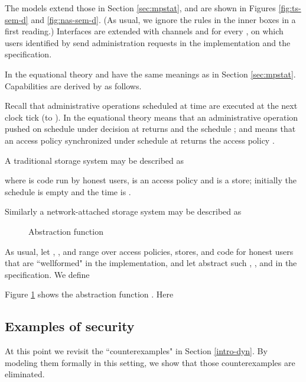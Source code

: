 \documentclass[10pt]{article}
\begin{document}
The models extend those in Section \ref{sec:mpstat}, and are shown in Figures \ref{fig:ts-sem-d} and \ref{fig:nas-sem-d}. (As usual, we ignore the rules in the inner boxes in a first reading.) Interfaces are extended with channels  and  for every , on which users identified by  send administration requests in the implementation and the specification. 

In the equational theory  and  have the same meanings as in Section \ref{sec:mpstat}. Capabilities are derived by  as follows. 

Recall that administrative operations scheduled at time  are executed at the next clock tick (to ). In the equational theory  means that an administrative operation  pushed on schedule  under decision  at  returns  and the schedule ; and  means that an access policy  synchronized under schedule  at  returns the access policy .

A traditional storage system may be described as

where  is code run by honest users,  is an access policy and  is a store; initially the schedule is empty and the time is .

Similarly a network-attached storage system may be described as





\begin{figure}
\hspace{-0.5cm}\fbox{\parbox{13.0cm}{\small





}}
\caption{Abstraction function}
   \label{fig:abs-d}
\end{figure}











As usual, let , , and  range over access policies, stores, and code for honest users that are ``wellformed" in the implementation, and let  abstract such , , and  in the specification. We define

Figure \ref{fig:abs-d} shows the abstraction function . Here


\subsection{Examples of security}
At this point we revisit the ``counterexamples" in Section \ref{intro-dyn}. By modeling them formally in this setting, we show that those counterexamples are eliminated. 
\end{document}
